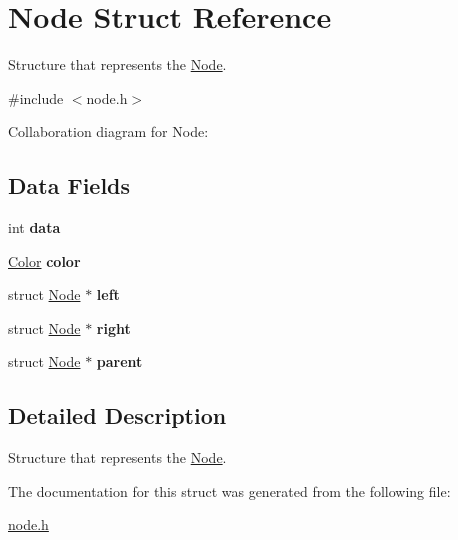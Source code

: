 \hypertarget{structNode}{}\section{Node Struct Reference}
\label{structNode}


Structure that represents the \hyperlink{structNode}{Node}.  




{\ttfamily \#include $<$node.\+h$>$}



Collaboration diagram for Node\+:
\subsection*{Data Fields}
\begin{DoxyCompactItemize}
\item 
int {\bfseries data}\hypertarget{structNode_a87c003c9f600e3fc58e6e90835f0b605}{}\label{structNode_a87c003c9f600e3fc58e6e90835f0b605}

\item 
\hyperlink{node_8h_ab87bacfdad76e61b9412d7124be44c1c}{Color} {\bfseries color}\hypertarget{structNode_ae8152345487a4ebed55af7fd35d29303}{}\label{structNode_ae8152345487a4ebed55af7fd35d29303}

\item 
struct \hyperlink{structNode}{Node} $\ast$ {\bfseries left}\hypertarget{structNode_ad0976834843c7618677d22a10c495b36}{}\label{structNode_ad0976834843c7618677d22a10c495b36}

\item 
struct \hyperlink{structNode}{Node} $\ast$ {\bfseries right}\hypertarget{structNode_ab6efacd91b201750b51775a3b79dd75c}{}\label{structNode_ab6efacd91b201750b51775a3b79dd75c}

\item 
struct \hyperlink{structNode}{Node} $\ast$ {\bfseries parent}\hypertarget{structNode_a208366dbdfb1137494bd9ffe97f0598d}{}\label{structNode_a208366dbdfb1137494bd9ffe97f0598d}

\end{DoxyCompactItemize}


\subsection{Detailed Description}
Structure that represents the \hyperlink{structNode}{Node}. 

The documentation for this struct was generated from the following file\+:\begin{DoxyCompactItemize}
\item 
\hyperlink{node_8h}{node.\+h}\end{DoxyCompactItemize}
